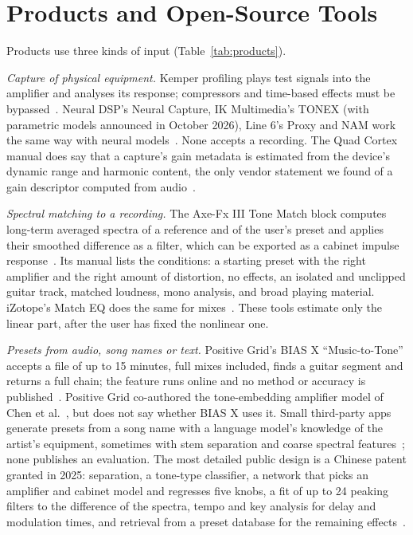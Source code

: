 \section{Products and Open-Source Tools}
\label{sec:products}

Products use three kinds of input (Table~\ref{tab:products}).

\emph{Capture of physical equipment.} Kemper profiling plays test signals into
the amplifier and analyses its response; compressors and time-based effects
must be bypassed~\cite{kemper2018manual}. Neural DSP's Neural Capture,
IK Multimedia's TONEX (with parametric models announced in October 2026),
Line 6's Proxy and NAM work the same way with neural
models~\cite{neuraldsp2026qcmanual,ik2026parametric,line6ndproxy,atkinsonndnam}.
None accepts a recording. The Quad Cortex manual does say that a capture's gain
metadata is estimated from the device's dynamic range and harmonic content,
the only vendor statement we found of a gain descriptor computed from
audio~\cite{neuraldsp2026qcmanual}.

\emph{Spectral matching to a recording.} The Axe-Fx III Tone Match block
computes long-term averaged spectra of a reference and of the user's preset
and applies their smoothed difference as a filter, which can be exported as a
cabinet impulse response~\cite{fractalndtonematch}. Its manual lists the
conditions: a starting preset with the right amplifier and the right amount of
distortion, no effects, an isolated and unclipped guitar track, matched
loudness, mono analysis, and broad playing material. iZotope's Match EQ does
the same for mixes~\cite{izotope2019matcheq}. These tools estimate only the
linear part, after the user has fixed the nonlinear one.

\emph{Presets from audio, song names or text.} Positive Grid's BIAS X
``Music-to-Tone'' accepts a file of up to 15 minutes, full mixes included,
finds a guitar segment and returns a full chain; the feature runs online and
no method or accuracy is published~\cite{positivegridndbiasxhelp,positivegrid2025biasxai}.
Positive Grid co-authored the tone-embedding amplifier model of Chen et
al.~\cite{chen2024zeroshot}, but does not say whether BIAS X uses it. Small
third-party apps generate presets from a song name with a language model's
knowledge of the artist's equipment, sometimes with stem separation and coarse
spectral features~\cite{bouharb2026gptonebuilder,aitonetechndgenerator}; none
publishes an evaluation. The most detailed public design is a Chinese patent
granted in 2025: separation, a tone-type classifier, a network that picks an
amplifier and cabinet model and regresses five knobs, a fit of up to 24
peaking filters to the difference of the spectra, tempo and key analysis for
delay and modulation times, and retrieval from a preset database for the
remaining effects~\cite{huanyin2025presetpatent}.

